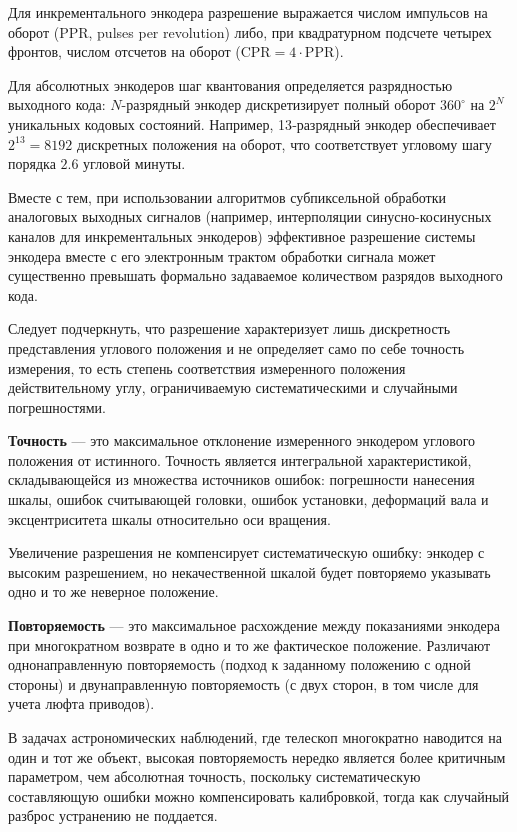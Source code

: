 Для инкрементального энкодера разрешение выражается числом импульсов на оборот (PPR, pulses per revolution) либо, при квадратурном подсчете четырех фронтов, числом отсчетов на оборот ($\text{CPR} = 4 \cdot\text{PPR}$).

Для абсолютных энкодеров шаг квантования определяется разрядностью выходного кода: $N$-разрядный энкодер дискретизирует полный оборот $360^\circ$ на $2^N$ уникальных кодовых состояний. Например, 13‑разрядный энкодер обеспечивает $2^{13} = 8192$ дискретных положения на оборот, что соответствует угловому шагу порядка $2.6$ угловой минуты. 

Вместе с тем, при использовании алгоритмов субпиксельной обработки аналоговых выходных сигналов (например, интерполяции синусно-косинусных каналов для инкрементальных энкодеров) эффективное разрешение системы энкодера вместе с его электронным трактом обработки сигнала может существенно превышать формально задаваемое количеством разрядов выходного кода.

Следует подчеркнуть, что разрешение характеризует лишь дискретность представления углового положения и не определяет само по себе точность измерения, то есть степень соответствия измеренного положения действительному углу, ограничиваемую систематическими и случайными погрешностями.

\textbf{Точность} --- это максимальное отклонение измеренного энкодером углового положения от истинного. Точность является интегральной характеристикой, складывающейся из множества источников ошибок: погрешности нанесения шкалы, ошибок считывающей головки, ошибок установки, деформаций вала и эксцентриситета шкалы относительно оси вращения.

Увеличение разрешения не компенсирует систематическую ошибку: энкодер с высоким разрешением, но некачественной шкалой будет повторяемо указывать одно и то же неверное положение.

\textbf{Повторяемость} --- это максимальное расхождение между показаниями энкодера при многократном возврате в одно и то же фактическое положение. Различают однонаправленную повторяемость (подход к заданному положению с одной стороны) и двунаправленную повторяемость (с двух сторон, в том числе для учета люфта приводов).

В задачах астрономических наблюдений, где телескоп многократно наводится на один и тот же объект, высокая повторяемость нередко является более критичным параметром, чем абсолютная точность, поскольку систематическую составляющую ошибки можно компенсировать калибровкой, тогда как случайный разброс устранению не поддается.

